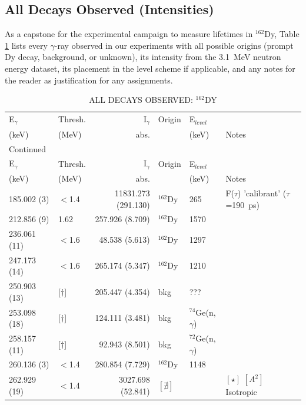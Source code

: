 \begin{landscape}
\end{landscape}

\subsection{All Decays Observed (Intensities)}
As a capstone for the experimental campaign to measure lifetimes in $^{162}$Dy, Table \ref{tab:162Dy_all_gammas} lists every $\gamma$-ray observed in our experiments with all possible origins (prompt Dy decay, background, or unknown), its intensity from the 3.1~MeV neutron energy dataset, its placement in the level scheme if applicable, and any notes for the reader as justification for any assignments.

\begin{landscape}
\begin{center}
\begin{longtable}{p{2.6cm}|p{1.2cm}|r|p{1.1cm}|p{2.0cm}|l}
\caption{ALL DECAYS OBSERVED: $^{162}$DY \label{tab:162Dy_all_gammas}}\\
E$_\gamma$ & Thresh. & I$_\gamma$ & Origin & E$_{level}$ &  \\ (keV) &  (MeV) &  abs. &  & (keV) & Notes  \\\hline\hline\endfirsthead
\caption[]{ALL DECAYS OBSERVED: $^{162}$DY}{Continued}\\
E$_\gamma$ & Thresh. & I$_\gamma$ & Origin & E$_{level}$ &  \\ (keV) &  (MeV) &  abs. &  & (keV) & Notes  \\\hline\hline\endhead
   185.002 (3)   & $<$1.4    &11831.273 (291.130)& $^{162}$Dy & 265  & F($\tau$) 'calibrant' ($\tau$=190~ps)\\
   212.856 (9)   & 1.62      &  257.926 (8.709) & $^{162}$Dy & 1570 &\\
   236.061 (11)  & $<$1.6    &   48.538 (5.613)  & $^{162}$Dy & 1297 &\\
   247.173 (14)  & $<$1.6    & 265.174 (5.347)   & $^{162}$Dy & 1210 &\\
   250.903 (13)  & [$\dagger$] & 205.447 (4.354)   & bkg & ??? &\\
   253.098 (18)  & [$\dagger$] & 124.111 (3.481)& bkg & $^{74}$Ge(n,$\gamma$) &\\
   258.157 (11)  & [$\dagger$] &  92.943 (8.501)& bkg & $^{72}$Ge(n,$\gamma$) &\\
   260.136 (3)   & $<$1.4    & 280.854 (7.729)& $^{162}$Dy & 1148 &\\
   262.929 (19)  & $<$1.4    & 3027.698 (52.841)& $[\nexists]$ && $[\star]$ $[A^2]$ Isotropic  \\

\end{longtable}
\end{center}
\end{landscape}
